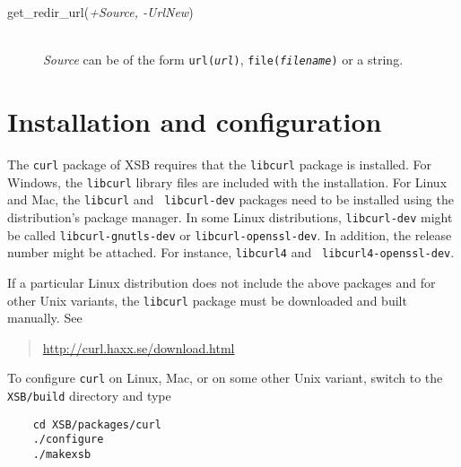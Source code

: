 \begin{description}
\item[get\_redir\_url({\it +Source, -UrlNew})]\mbox{}
  \\
  {\it Source} can be of the form {\tt url({\it {url}})}, {\tt file({\it {filename}})} or a string.

\end{description}

\section{Installation and configuration}

The {\tt curl} package of XSB requires that the {\tt libcurl} package is
installed.  For Windows, the {\tt libcurl} library files are included with
the installation. For Linux and Mac, the {\tt libcurl} and {\tt
  libcurl-dev} packages need to be installed using the distribution's
package manager. In some Linux distributions, {\tt libcurl-dev} might be
called {\tt libcurl-gnutls-dev} or {\tt libcurl-openssl-dev}.  In addition,
the release number might be attached. For instance, {\tt libcurl4} and {\tt
  libcurl4-openssl-dev}.

If a particular Linux distribution does not include the above packages and
for other Unix variants, the {\tt libcurl} package must be downloaded and
built manually. See
\begin{quote}
  \url{http://curl.haxx.se/download.html} 
\end{quote}
To configure {\tt curl} on Linux, Mac, or on some other Unix variant,
switch to the {\tt XSB/build} directory and type

\begin{verbatim}
    cd XSB/packages/curl
    ./configure
    ./makexsb
\end{verbatim}

